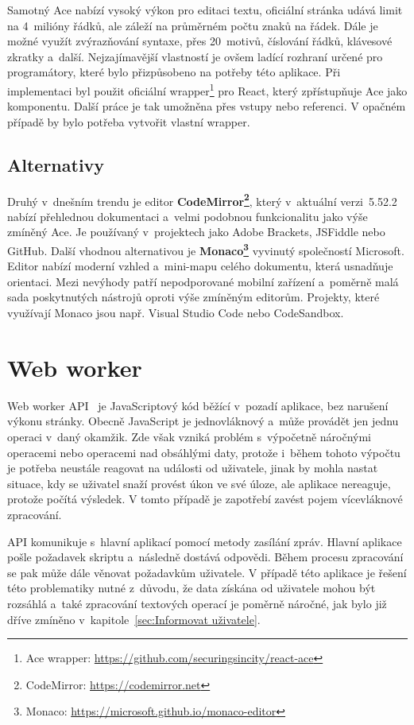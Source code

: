 Samotný Ace nabízí vysoký výkon pro editaci textu, oficiální stránka udává limit na 4~milióny řádků, ale záleží na průměrném počtu znaků na řádek. Dále je možné využít zvýrazňování syntaxe, přes 20~motivů, číslování řádků, klávesové zkratky a~další. Nejzajímavější vlastností je ovšem ladící rozhraní určené pro programátory, které bylo přizpůsobeno na potřeby této aplikace. Při implementaci byl použit oficiální wrapper\footnote{Ace wrapper: \url{https://github.com/securingsincity/react-ace}} pro React, který zpřístupňuje Ace jako komponentu. Další práce je tak umožněna přes vstupy nebo referenci. V opačném případě by bylo potřeba vytvořit vlastní wrapper.

\subsection*{Alternativy}
Druhý v~dnešním trendu je editor \textbf{CodeMirror\footnote{CodeMirror: \url{https://codemirror.net}}}, který v~aktuální verzi~5.52.2 nabízí přehlednou dokumentaci a~velmi podobnou funkcionalitu jako výše zmíněný Ace. Je používaný v~projektech jako Adobe Brackets, JSFiddle nebo GitHub. Další vhodnou alternativou je \textbf{Monaco\footnote{Monaco: \url{https://microsoft.github.io/monaco-editor}}} vyvinutý společností Microsoft. Editor nabízí moderní vzhled a~mini-mapu celého dokumentu, která usnadňuje orientaci. Mezi nevýhody patří nepodporované mobilní zařízení a~poměrně malá sada poskytnutých nástrojů oproti výše zmíněným editorům. Projekty, které využívají Monaco jsou např. Visual Studio Code nebo CodeSandbox.

\section{Web worker}
Web worker API~\cite{website:WebWorkers} je JavaScriptový kód běžící v~pozadí aplikace, bez narušení výkonu stránky. Obecně JavaScript je jednovláknový a~může provádět jen jednu operaci v~daný okamžik. Zde však vzniká problém s~výpočetně náročnými operacemi nebo operacemi nad obsáhlými daty, protože i~během tohoto výpočtu je potřeba neustále reagovat na události od uživatele, jinak by mohla nastat situace, kdy se uživatel snaží provést úkon ve své úloze, ale aplikace nereaguje, protože počítá výsledek. V tomto případě je zapotřebí zavést pojem vícevláknové zpracování.

API komunikuje s~hlavní aplikací pomocí metody zasílání zpráv. Hlavní aplikace pošle požadavek skriptu a~následně dostává odpovědi. Během procesu zpracování se pak může dále věnovat požadavkům uživatele. V případě této aplikace je řešení této problematiky nutné z~důvodu, že data získána od uživatele mohou být rozsáhlá a~také zpracování textových operací je poměrně náročné, jak bylo již dříve zmíněno v~kapitole~\ref{sec:Informovat uživatele}.

